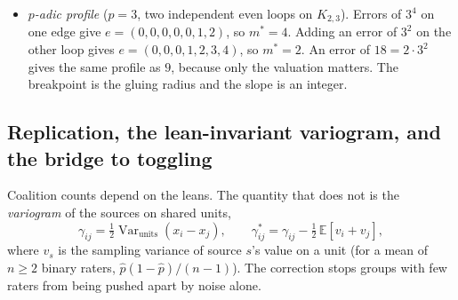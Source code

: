 \documentclass[11pt]{article}
\theoremstyle{definition}
\theoremstyle{remark}
\begin{document}
\begin{itemize}
    \begin{itemize}
      \item The claims of any \emph{single} unit glue at full precision (24 of 24 units): a filled cell is flat, the $p$-adic form of Proposition~\ref{prop:filled}.
      \item Keeping the units of arity $\ge K$, the claims glue to radius $3^{-1}$, $3^{-2}$ and $3^{-4}$ for $K=2,3,4$. The order profiles are $e=(0,0,1,2,\dots)$, $(0,0,0,1,\dots)$ and $(0,0,0,0,0,1,\dots)$.
      \item The arity filtration therefore gives \emph{nested gluing radii}, each set by the precision of its grade, with integer slopes above each radius.
      \item Real bias scores are not arithmetic, so this check is synthetic. On data the real dendrogram of Proposition~\ref{prop:hull}(2) plays this role.
    \end{itemize}
  \item \emph{$p$-adic profile} ($p=3$, two independent even loops on $K_{2,3}$). Errors of $3^4$ on one edge give $e=(0,0,0,0,0,1,2)$, so $m^*=4$. Adding an error of $3^2$ on the other loop gives $e=(0,0,0,1,2,3,4)$, so $m^*=2$. An error of $18=2\cdot3^2$ gives the same profile as $9$, because only the valuation matters. The breakpoint is the gluing radius and the slope is an integer.
\end{itemize}

\subsection{Replication, the lean-invariant variogram, and the bridge to toggling}\label{sec:hull-rep}
Coalition counts depend on the leans. The quantity that does not is the \emph{variogram} of the sources on shared units,
\[
\gamma_{ij}=\tfrac12\operatorname{Var}_{\text{units}}(x_i-x_j),\qquad \gamma^*_{ij}=\gamma_{ij}-\tfrac12\,\mathbb E[v_i+v_j],
\]
where $v_s$ is the sampling variance of source $s$'s value on a unit (for a mean of $n\ge2$ binary raters, $\hat p(1-\hat p)/(n-1)$). The correction stops groups with few raters from being pushed apart by noise alone.
\end{document}
